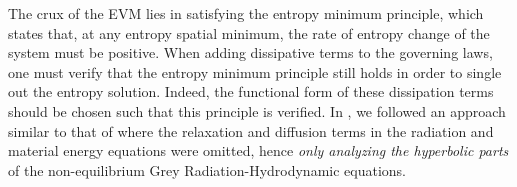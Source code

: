 \documentclass[times,doublespace]{fldauth}%
\begin{document}
The crux of the EVM lies in satisfying the entropy minimum principle, which states that, at any entropy spatial 
minimum, the rate of entropy change of the system must be positive. When
adding dissipative terms to the governing laws, one must verify that the entropy minimum principle still holds in 
order to single out the entropy solution. Indeed, the functional form of these dissipation terms
should be chosen such that this principle is verified. In \cite{our_jcp_radhy_paper}, we followed an approach 
similar to that of \cite{Balsara, LowrieMorel} 
where the relaxation and diffusion terms in the radiation and material energy equations were omitted, hence {\it only analyzing the hyperbolic parts} of 
the non-equilibrium Grey Radiation-Hydrodynamic equations. 
%
%
%
\end{document}
